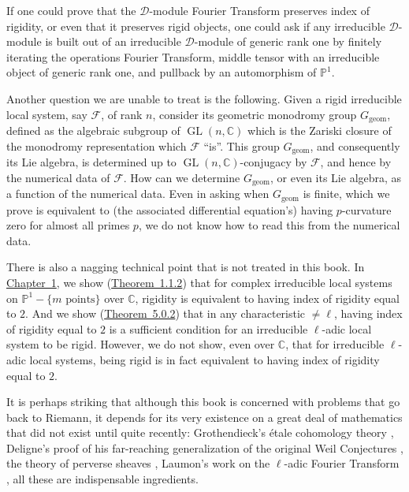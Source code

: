 If one could prove that the \(\mathcal{D}\)-module Fourier Transform
preserves index of rigidity, or even that it preserves rigid objects, one
could ask if any irreducible \(\mathcal{D}\)-module is built out of an
irreducible \(\mathcal{D}\)-module of generic rank one by finitely iterating
the operations Fourier Transform, middle tensor with an irreducible
object of generic rank one, and pullback by an automorphism of
\(\mathbb{P}^1\).

Another question we are unable to treat is the following. Given a rigid
irreducible local system, say \(\mathcal{F}\), of rank \(n\), consider its
geometric monodromy group \(G_{\mathrm{geom}}\), defined as the algebraic
subgroup of \(\operatorname{GL}(n,\mathbb{C})\) which is the Zariski closure
of the monodromy representation which \(\mathcal{F}\) ``is''. This group
\(G_{\mathrm{geom}}\), and consequently its Lie algebra, is determined up
to \(\operatorname{GL}(n,\mathbb{C})\)-conjugacy by \(\mathcal{F}\), and
hence by the numerical data of \(\mathcal{F}\). How can we determine
\(G_{\mathrm{geom}}\), or even its Lie algebra, as a function of the
numerical data. Even in asking when \(G_{\mathrm{geom}}\) is finite, which
we prove is equivalent to (the associated differential equation's) having
\(p\)-curvature zero for almost all primes \(p\), we do not know how to
read this from the numerical data.

There is also a nagging technical point that is not treated in this book.
In \hyperref[chap:1]{Chapter~1}, we show (\hyperref[thm:1.1.2]{Theorem~1.1.2}) that
for complex irreducible local systems on
\(\mathbb{P}^1-\{m\text{ points}\}\) over \(\mathbb{C}\), rigidity is
equivalent to having index of rigidity equal to \(2\). And we show
(\hyperref[thm:5.0.2]{Theorem~5.0.2}) that in any characteristic \(\ne\ell\),
having index of rigidity equal to \(2\) is a sufficient condition for an
irreducible \(\ell\)-adic local system to be rigid. However, we do not
show, even over \(\mathbb{C}\), that for irreducible \(\ell\)-adic local
systems, being rigid is in fact equivalent to having index of rigidity
equal to \(2\).

It is perhaps striking that although this book is concerned with problems
that go back to Riemann, it depends for its very existence on a great deal
of mathematics that did not exist until quite recently: Grothendieck's
\'etale cohomology theory \cite{SGA}, Deligne's proof of his far-reaching
generalization of the original Weil Conjectures \cite{De-WeilII}, the
theory of perverse sheaves \cite{BBD}, Laumon's work on the \(\ell\)-adic
Fourier Transform \cite{Lau-TF}, all these are indispensable ingredients.

